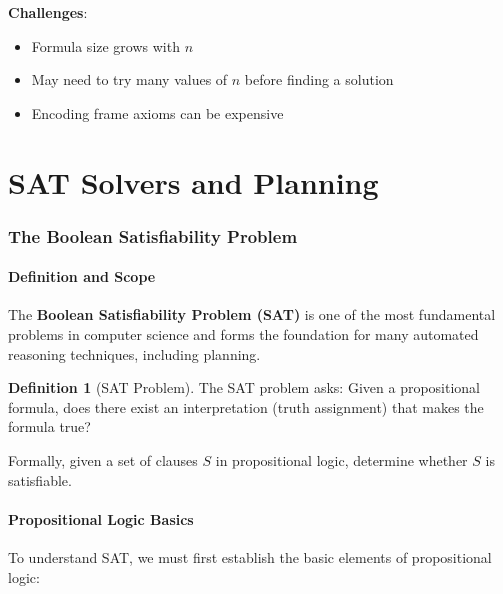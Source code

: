 \documentclass[11pt,a4paper]{article}
\theoremstyle{definition}
\newtheorem{definition}{Definition}[section]
\theoremstyle{plain}
\theoremstyle{remark}
\begin{document}
\textbf{Challenges}:
\begin{itemize}
    \item Formula size grows with $n$
    \item May need to try many values of $n$ before finding a solution
    \item Encoding frame axioms can be expensive
\end{itemize}



\newpage

\part{SAT Solvers and Planning}

\section{The Boolean Satisfiability Problem}

\subsection{Definition and Scope}

The \textbf{Boolean Satisfiability Problem (SAT)} is one of the most fundamental problems in computer science and forms the foundation for many automated reasoning techniques, including planning.

\begin{tcolorbox}[colback=blue!5!white,colframe=blue!75!black,title=\textbf{SAT Problem}]
\begin{definition}[SAT Problem]
The SAT problem asks: Given a propositional formula, does there exist an interpretation (truth assignment) that makes the formula true?

Formally, given a set of clauses $S$ in propositional logic, determine whether $S$ is satisfiable.
\end{definition}
\end{tcolorbox}

\subsection{Propositional Logic Basics}

To understand SAT, we must first establish the basic elements of propositional logic:
\end{document}
